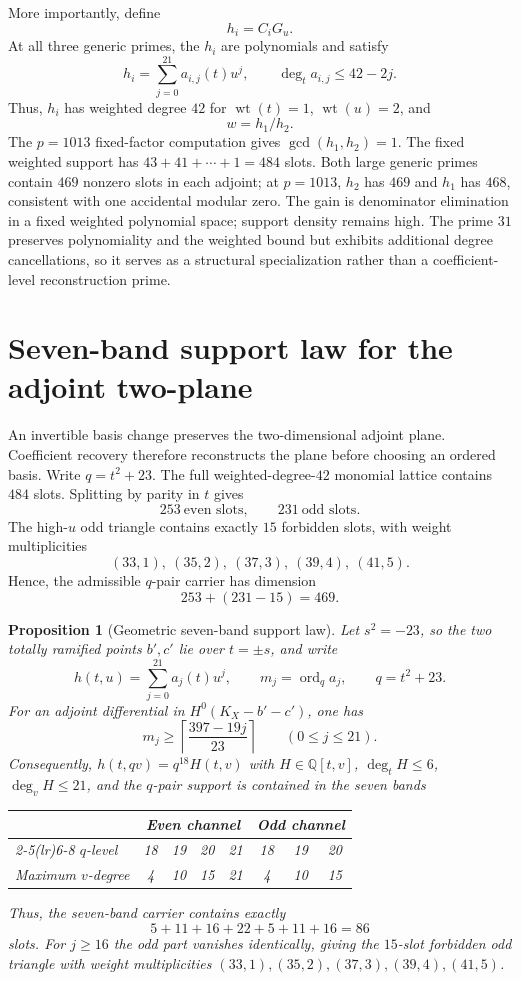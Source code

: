 \documentclass[11pt]{article}
\newtheorem{proposition}[theorem]{Proposition}
\newcommand{\Q}{\mathbb Q}
\begin{document}
More importantly, define
\[
 h_i=C_iG_u.
\]
At all three generic primes, the $h_i$ are polynomials and satisfy
\[
 h_i=\sum_{j=0}^{21}a_{i,j}(t)u^j,
 \qquad \deg_t a_{i,j}\le 42-2j.
\]
Thus, $h_i$ has weighted degree $42$ for
$\operatorname{wt}(t)=1$, $\operatorname{wt}(u)=2$, and
\[
 \boxed{w=h_1/h_2}.
\]
The $p=1013$ fixed-factor computation gives
$\gcd(h_1,h_2)=1$.  The fixed weighted support has
$43+41+\cdots+1=484$ slots.  Both large generic primes contain $469$
nonzero slots in each adjoint; at $p=1013$, $h_2$ has $469$ and $h_1$
has $468$, consistent with one accidental modular zero.  The gain is denominator elimination in a fixed weighted polynomial space; support density remains high.  The prime $31$ preserves polynomiality and the weighted
bound but exhibits additional degree cancellations, so it serves as a
structural specialization rather than a coefficient-level reconstruction
prime.

\section{Seven-band support law for the adjoint two-plane}\label{sec:seven-band}

An invertible basis change preserves the two-dimensional adjoint plane.  Coefficient recovery therefore reconstructs the plane before choosing an ordered basis.  Write $q=t^2+23$.  The full weighted-degree-$42$ monomial lattice contains $484$ slots.  Splitting by parity in $t$ gives
\[
 253\ \text{even slots},\qquad 231\ \text{odd slots}.
\]
The high-$u$ odd triangle contains exactly $15$ forbidden slots, with weight multiplicities
\[
 (33,1),\ (35,2),\ (37,3),\ (39,4),\ (41,5).
\]
Hence, the admissible $q$-pair carrier has dimension
\[
 253+(231-15)=469.
\]
\begin{proposition}[Geometric seven-band support law]\label{prop:seven-band}
Let $s^2=-23$, so the two totally ramified points $b',c'$ lie over
$t=\pm s$, and write
\[
 h(t,u)=\sum_{j=0}^{21}a_j(t)u^j,\qquad
 m_j=\operatorname{ord}_{q}a_j,\qquad q=t^2+23.
\]
For an adjoint differential in $H^0(K_X-b'-c')$, one has
\[
 \boxed{\displaystyle
 m_j\ge \left\lceil\frac{397-19j}{23}\right\rceil}
 \qquad(0\le j\le21).
\]
Consequently, $h(t,qv)=q^{18}H(t,v)$ with
$H\in\Q[t,v]$, $\deg_tH\le6$, $\deg_vH\le21$, and the $q$-pair
support is contained in the seven bands
\begin{center}
\small
\renewcommand{\arraystretch}{1.12}
\setlength{\tabcolsep}{5.5pt}
\begin{tabular}{lccccccc}
\toprule
& \multicolumn{4}{c}{Even channel} & \multicolumn{3}{c}{Odd channel} \\
\cmidrule(lr){2-5}\cmidrule(lr){6-8}
$q$-level & 18 & 19 & 20 & 21 & 18 & 19 & 20 \\
Maximum $v$-degree & 4 & 10 & 15 & 21 & 4 & 10 & 15 \\
\bottomrule
\end{tabular}
\end{center}
Thus, the seven-band carrier contains exactly
\[
 5+11+16+22+5+11+16=86
\]
slots.  For $j\ge16$ the odd part vanishes identically, giving the
$15$-slot forbidden odd triangle with weight multiplicities
$(33,1),(35,2),(37,3),(39,4),(41,5)$.
\end{proposition}
\end{document}
